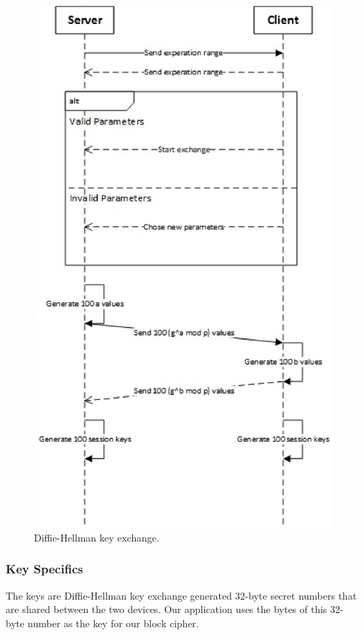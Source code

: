 \begin{figure}
  \includegraphics[width=\linewidth]{keyExchange.eps}
  \caption{Diffie-Hellman key exchange.}
  \label{fig:keyExchange}
\end{figure}

\subsubsection{Key Specifics}
The keys are Diffie-Hellman key exchange generated 32-byte secret numbers that are shared between
the two devices. Our application uses the bytes of this 32-byte number as the key for our block cipher.


